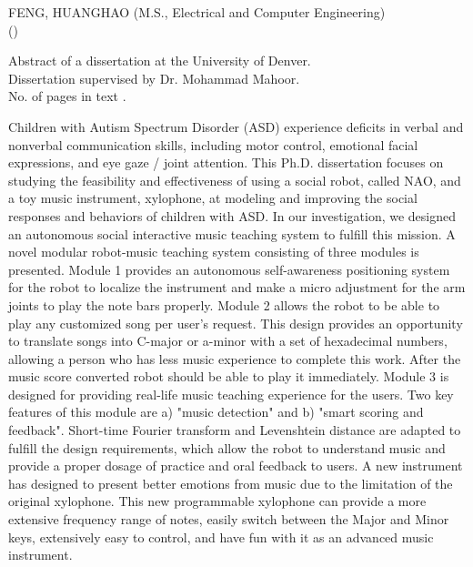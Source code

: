 \newpage
\pagestyle{empty}
\renewcommand{\baselinestretch}{1}
\begin{flushleft}
\small {
FENG, HUANGHAO  \hfill (M.S., Electrical and Computer Engineering)\\
\underline{} \hfill (\mydate)\\
\underline{}}

\vspace{0.25in}
Abstract of a dissertation at the University of Denver.\\
\vspace{0.25in}
Dissertation supervised by Dr. Mohammad Mahoor.\\
No. of pages in text \underline{\pageref{LastPage}}.
\end{flushleft}
\renewcommand{\baselinestretch}{2}
\normalsize{Children with Autism Spectrum Disorder (ASD) experience deficits in verbal and nonverbal communication skills, including motor control, emotional facial expressions, and eye gaze / joint attention. This Ph.D. dissertation focuses on studying the feasibility and effectiveness of using a social robot, called NAO, and a toy music instrument, xylophone, at modeling and improving the social responses and behaviors of children with ASD. In our investigation, we designed an autonomous social interactive music teaching system to fulfill this mission.
A novel modular robot-music teaching system consisting of three modules is presented. Module 1 provides an autonomous self-awareness positioning system for the robot to localize the instrument and make a micro adjustment for the arm joints to play the note bars properly. Module 2 allows the robot to be able to play any customized song per user’s request. This design provides an opportunity to translate songs into C-major or a-minor with a set of hexadecimal numbers, allowing a person who has less music experience to complete this work. After the music score converted robot should be able to play it immediately. Module 3 is designed for providing real-life music teaching experience for the users. Two key features of this module are a) "music detection" and b) "smart scoring and feedback". Short-time Fourier transform and Levenshtein distance are adapted to fulfill the design requirements, which allow the robot to understand music and provide a proper dosage of practice and oral feedback to users. A new instrument has designed to present better emotions from music due to the limitation of the original xylophone. This new programmable xylophone can provide a more extensive frequency range of notes, easily switch between the Major and Minor keys, extensively easy to control, and have fun with it as an advanced music instrument. 

}
